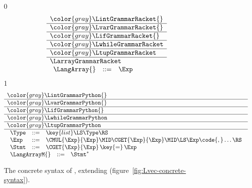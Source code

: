 \documentclass[7x10]{TimesAPriori_MIT}%
\newcommand{\gray}[1]{{\color{gray} #1}}
\def\racketEd{0}
\def\pythonEd{1}
\def\edition{1}
\newcommand{\pythonColor}[0]{}
\numberwithin{theorem}{chapter}
\numberwithin{definition}{chapter}
\numberwithin{equation}{chapter}
\begin{document}
\newcommand{\LarrayGrammarPython}{
\begin{array}{lcl}
  \Type &::=& \key{list}\LS\Type\RS \\
  \Exp &::=& \CMUL{\Exp}{\Exp}
    \MID \CGET{\Exp}{\Exp}
    \MID \LS \Exp \code{,} \ldots \RS \\
  \Stmt &::= & \CGET{\Exp}{\Exp} \mathop{\key{=}}\Exp
\end{array}
}
\newcommand{\LarrayASTPython}{
\begin{array}{lcl}
  \Type &::=& \key{ListType}\LP\Type\RP \\
  \Exp &::=& \MUL{\Exp}{\Exp}
    \MID \GET{\Exp}{\Exp} \\
    &\MID& \key{List}\LP \Exp \code{,} \ldots \code{, } \code{Load()} \RP \\
  \Stmt &::= & \ASSIGN{ \PUT{\Exp}{\Exp} }{\Exp}
\end{array}
}

\begin{figure}[tp]
\centering
\begin{tcolorbox}[colback=white]
    \small
{\if\edition\racketEd    
\[
\begin{array}{l}
  \gray{\LintGrammarRacket{}} \\ \hline
  \gray{\LvarGrammarRacket{}} \\ \hline
  \gray{\LifGrammarRacket{}} \\ \hline
  \gray{\LwhileGrammarRacket} \\ \hline
  \gray{\LtupGrammarRacket} \\ \hline
  \LarrayGrammarRacket \\
\begin{array}{lcl}
  \LangArray{} &::=& \Exp
\end{array}
\end{array}
\]
\fi}
{\if\edition\pythonEd\pythonColor    
\[
\begin{array}{l}
  \gray{\LintGrammarPython{}} \\ \hline
  \gray{\LvarGrammarPython{}} \\ \hline
  \gray{\LifGrammarPython{}} \\ \hline
  \gray{\LwhileGrammarPython} \\ \hline
  \gray{\LtupGrammarPython} \\ \hline
  \LarrayGrammarPython \\
\begin{array}{rcl}
  \LangArrayM{} &::=& \Stmt^{*}
\end{array}
\end{array}
\]
\fi}
\end{tcolorbox}
\caption{The concrete syntax of \LangArray{}, extending \LangVec{} (figure~\ref{fig:Lvec-concrete-syntax}).}
\label{fig:Lvecof-concrete-syntax}
\end{figure}
\end{document}
